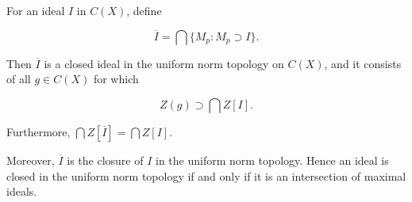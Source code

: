 For an ideal \(I\) in \(C(X)\), define

\[
\overline{I} = \bigcap \{ M_p : M_p \supset I \}.
\]

Then \(\overline{I}\) is a closed ideal in the uniform norm topology on \(C(X)\), and it consists of all \(g \in C(X)\) for which

\[
Z(g) \supset \bigcap Z[I].
\]

Furthermore, \(\bigcap Z[\overline{I}] = \bigcap Z[I]\).

Moreover, \(\overline{I}\) is the closure of \(I\) in the uniform norm topology. Hence an ideal is closed in the uniform norm topology if and only if it is an intersection of maximal ideals.
